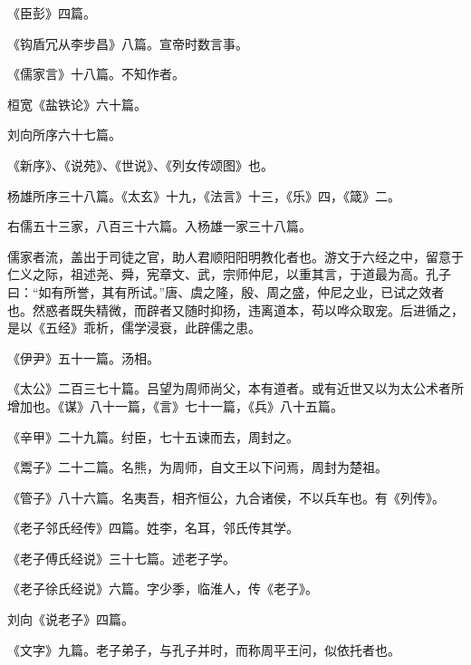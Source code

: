 \documentclass[12pt,UTF8]{ctexbook}
\begin{document}
《臣彭》四篇。



《钩盾冗从李步昌》八篇。宣帝时数言事。



《儒家言》十八篇。不知作者。



桓宽《盐铁论》六十篇。



刘向所序六十七篇。



《新序》、《说苑》、《世说》、《列女传颂图》也。



杨雄所序三十八篇。《太玄》十九，《法言》十三，《乐》四，《箴》二。



右儒五十三家，八百三十六篇。入杨雄一家三十八篇。



儒家者流，盖出于司徒之官，助人君顺阳阳明教化者也。游文于六经之中，留意于仁义之际，祖述尧、舜，宪章文、武，宗师仲尼，以重其言，于道最为高。孔子曰：“如有所誉，其有所试。”唐、虞之隆，殷、周之盛，仲尼之业，已试之效者也。然惑者既失精微，而辟者又随时抑扬，违离道本，苟以哗众取宠。后进循之，是以《五经》乖析，儒学浸衰，此辟儒之患。



《伊尹》五十一篇。汤相。



《太公》二百三七十篇。吕望为周师尚父，本有道者。或有近世又以为太公术者所增加也。《谋》八十一篇，《言》七十一篇，《兵》八十五篇。



《辛甲》二十九篇。纣臣，七十五谏而去，周封之。



《鬻子》二十二篇。名熊，为周师，自文王以下问焉，周封为楚祖。



《管子》八十六篇。名夷吾，相齐恒公，九合诸侯，不以兵车也。有《列传》。



《老子邻氏经传》四篇。姓李，名耳，邻氏传其学。



《老子傅氏经说》三十七篇。述老子学。



《老子徐氏经说》六篇。字少季，临淮人，传《老子》。



刘向《说老子》四篇。



《文字》九篇。老子弟子，与孔子并时，而称周平王问，似依托者也。
\end{document}
